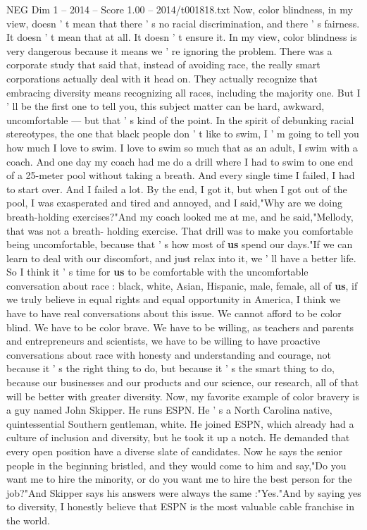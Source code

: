 \begin{textsample}{NEG Dim 1 – 2014 – Score 1.00 – 2014/t001818.txt}
Now, color blindness, in my view, doesn ' t mean that there ' s no racial discrimination, and there ' s fairness.
It doesn ' t mean that at all.
It doesn ' t ensure it.
In my view, color blindness is very dangerous because it means we ' re ignoring the problem.
There was a corporate study that said that, instead of avoiding race, the really smart corporations actually deal with it head on.
They actually recognize that embracing diversity means recognizing all races, including the majority one.
But I ' ll be the first one to tell you, this subject matter can be hard, awkward, uncomfortable — but that ' s kind of the point.
In the spirit of debunking racial stereotypes, the one that black people don ' t like to swim, I ' m going to tell you how much I love to swim.
I love to swim so much that as an adult, I swim with a coach.
And one day my coach had me do a drill where I had to swim to one end of a 25-meter pool without taking a breath.
And every single time I failed, I had to start over.
And I failed a lot.
By the end, I got it, but when I got out of the pool, I was exasperated and tired and annoyed, and I said,"Why are we doing breath-holding exercises?"And my coach looked me at me, and he said,"Mellody, that was not a breath- holding exercise.
That drill was to make you comfortable being uncomfortable, because that ' s how most of \textbf{us} spend our days."If we can learn to deal with our discomfort, and just relax into it, we ' ll have a better life.
So I think it ' s time for \textbf{us} to be comfortable with the uncomfortable conversation about race : black, white, Asian, Hispanic, male, female, all of \textbf{us}, if we truly believe in equal rights and equal opportunity in America, I think we have to have real conversations about this issue.
We cannot afford to be color blind.
We have to be color brave.
We have to be willing, as teachers and parents and entrepreneurs and scientists, we have to be willing to have proactive conversations about race with honesty and understanding and courage, not because it ' s the right thing to do, but because it ' s the smart thing to do, because our businesses and our products and our science, our research, all of that will be better with greater diversity.
Now, my favorite example of color bravery is a guy named John Skipper.
He runs ESPN.
He ' s a North Carolina native, quintessential Southern gentleman, white.
He joined ESPN, which already had a culture of inclusion and diversity, but he took it up a notch.
He demanded that every open position have a diverse slate of candidates.
Now he says the senior people in the beginning bristled, and they would come to him and say,"Do you want me to hire the minority, or do you want me to hire the best person for the job?"And Skipper says his answers were always the same :"Yes."And by saying yes to diversity, I honestly believe that ESPN is the most valuable cable franchise in the world.

\end{textsample}
